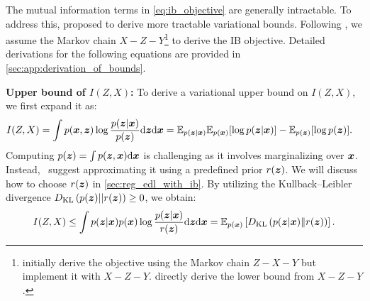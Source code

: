 The mutual information terms in \cref{eq:ib_objective} are generally intractable. To address this, \citet{alemi2017deep} proposed to derive more tractable variational bounds. Following \citet{wieczorek2020difference}, we assume the Markov chain $X - Z - Y$\footnote{\citet{alemi2017deep} initially derive the objective using the Markov chain $Z - X - Y$ but implement it with $X - Z - Y$.\citet{wieczorek2020difference} directly derive the lower bound from $X - Z - Y$.} to derive the IB objective. Detailed derivations for the following equations are provided in \cref{sec:app:derivation_of_bounds}.

\textbf{Upper bound of $I(Z, X)$:} To derive a variational upper bound on $I(Z, X)$, we first expand it as:
\begin{equation*}
    \begin{aligned}
         I(Z, X) &= \int p(\bm{x}, \bm{z}) \log \frac{p(\bm{z} | \bm{x})}{p(\bm{z})} \mathrm{d} \bm{z} \mathrm{d} \bm{x} = \mathbb{E}_{p(\bm{z}| \bm{x})} \mathbb{E}_{p(\bm{x})} [\log p(\bm{z} | \bm{x})] - \mathbb{E}_{p(\bm{z})}[\log p(\bm{z})].
    \end{aligned}
\end{equation*}
Computing $p(\bm{z}) = \int p(\bm{z}, \bm{x}) \mathrm{d} \bm{x}$ is challenging as it involves marginalizing over $\bm{x}$. Instead,~\citet{alemi2017deep} suggest approximating it using a predefined prior $r(\bm{z})$. We will discuss how to choose $r(\bm{z})$ in \cref{sec:reg_edl_with_ib}. By utilizing the Kullback–Leibler divergence $D_{\text{KL}}\left(p(\bm{z}) || r(\bm{z}) \right) \geq 0$, we obtain:
\begin{equation}
    \begin{aligned}
        I(Z, X) \leq \int p(\bm{z}| \bm{x}) p(\bm{x}) \log \frac{p(\bm{z} | \bm{x})}{r(\bm{z})} \mathrm{d} \bm{z} \mathrm{d} \bm{x} = \mathbb{E}_{p(\bm{x})} \left[D_{\text{KL}}\left(p(\bm{z} | \bm{x}) \| r(\bm{z}) \right)\right].
    \end{aligned}
    \label{eq:izx_upper_bound}
\end{equation}

